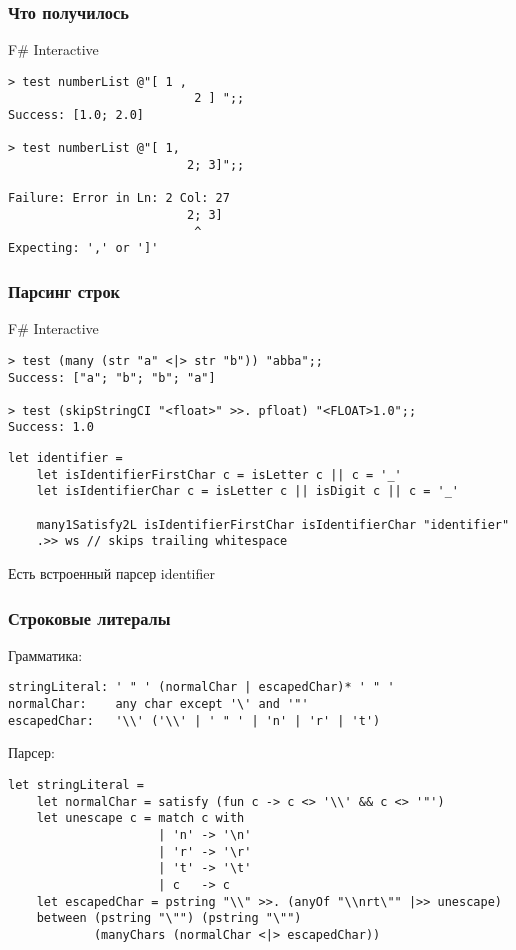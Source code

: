\documentclass[xetex,mathserif,serif]{beamer}
\begin{document}
    \begin{frame}[fragile]
        \frametitle{Что получилось}
        \begin{alertblock}{F\# Interactive}
            \begin{verbatim}
> test numberList @"[ 1 ,
                          2 ] ";;
Success: [1.0; 2.0]

> test numberList @"[ 1,
                         2; 3]";;

Failure: Error in Ln: 2 Col: 27
                         2; 3]
                          ^
Expecting: ',' or ']'
            \end{verbatim}
        \end{alertblock}
    \end{frame}

    \begin{frame}[fragile]
        \frametitle{Парсинг строк}
        \begin{alertblock}{F\# Interactive}
            \begin{verbatim}
> test (many (str "a" <|> str "b")) "abba";;
Success: ["a"; "b"; "b"; "a"]

> test (skipStringCI "<float>" >>. pfloat) "<FLOAT>1.0";;
Success: 1.0
            \end{verbatim}
        \end{alertblock}
        \begin{verbatim}
let identifier =
    let isIdentifierFirstChar c = isLetter c || c = '_'
    let isIdentifierChar c = isLetter c || isDigit c || c = '_'

    many1Satisfy2L isIdentifierFirstChar isIdentifierChar "identifier"
    .>> ws // skips trailing whitespace
        \end{verbatim}
        Есть встроенный парсер identifier
    \end{frame}

    \begin{frame}[fragile]
        \frametitle{Строковые литералы}
        \begin{small}
            Грамматика:
            \begin{verbatim}
stringLiteral: ' " ' (normalChar | escapedChar)* ' " '
normalChar:    any char except '\' and '"'
escapedChar:   '\\' ('\\' | ' " ' | 'n' | 'r' | 't')
            \end{verbatim}
            Парсер:
            \begin{verbatim}
let stringLiteral =
    let normalChar = satisfy (fun c -> c <> '\\' && c <> '"')
    let unescape c = match c with
                     | 'n' -> '\n'
                     | 'r' -> '\r'
                     | 't' -> '\t'
                     | c   -> c
    let escapedChar = pstring "\\" >>. (anyOf "\\nrt\"" |>> unescape)
    between (pstring "\"") (pstring "\"")
            (manyChars (normalChar <|> escapedChar))
            \end{verbatim}
        \end{small}
    \end{frame}
\end{document}
